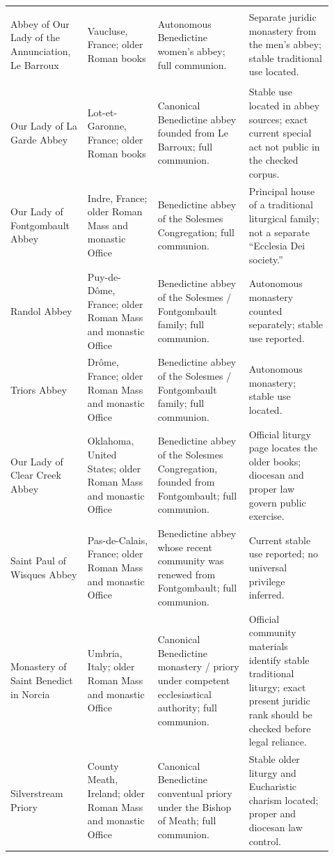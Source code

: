 \begin{longtable}{>{\bfseries\raggedright\arraybackslash}p{0.22\linewidth}>{\raggedright\arraybackslash}p{0.20\linewidth}>{\raggedright\arraybackslash}p{0.26\linewidth}>{\raggedright\arraybackslash}p{0.24\linewidth}}
Abbey of Our Lady of the Annunciation, Le Barroux & Vaucluse, France; older Roman books & Autonomous Benedictine women's abbey; full communion. & Separate juridic monastery from the men's abbey; stable traditional use located.\\
Our Lady of La Garde Abbey & Lot-et-Garonne, France; older Roman books & Canonical Benedictine abbey founded from Le Barroux; full communion. & Stable use located in abbey sources; exact current special act not public in the checked corpus.\\
Our Lady of Fontgombault Abbey & Indre, France; older Roman Mass and monastic Office & Benedictine abbey of the Solesmes Congregation; full communion. & Principal house of a traditional liturgical family; not a separate “Ecclesia Dei society.”\\
Randol Abbey & Puy-de-Dôme, France; older Roman Mass and monastic Office & Benedictine abbey of the Solesmes / Fontgombault family; full communion. & Autonomous monastery counted separately; stable use reported.\\
Triors Abbey & Drôme, France; older Roman Mass and monastic Office & Benedictine abbey of the Solesmes / Fontgombault family; full communion. & Autonomous monastery; stable use located.\\
Our Lady of Clear Creek Abbey & Oklahoma, United States; older Roman Mass and monastic Office & Benedictine abbey of the Solesmes Congregation, founded from Fontgombault; full communion. & Official liturgy page locates the older books; diocesan and proper law govern public exercise.\\
Saint Paul of Wisques Abbey & Pas-de-Calais, France; older Roman Mass and monastic Office & Benedictine abbey whose recent community was renewed from Fontgombault; full communion. & Current stable use reported; no universal privilege inferred.\\
Monastery of Saint Benedict in Norcia & Umbria, Italy; older Roman Mass and monastic Office & Canonical Benedictine monastery / priory under competent ecclesiastical authority; full communion. & Official community materials identify stable traditional liturgy; exact present juridic rank should be checked before legal reliance.\\
Silverstream Priory & County Meath, Ireland; older Roman Mass and monastic Office & Canonical Benedictine conventual priory under the Bishop of Meath; full communion. & Stable older liturgy and Eucharistic charism located; proper and diocesan law control.\\

\end{longtable}
